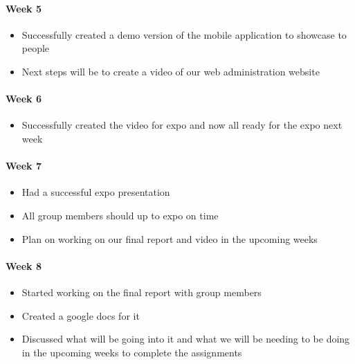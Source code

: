 \documentclass[onecolumn, draftclsnofoot,10pt, compsoc]{IEEEtran}
\begin{document}
      \paragraph{Week 5}
        \begin{itemize}
          \item Successfully created a demo version of the mobile application to showcase to people
          \item Next steps will be to create a video of our web administration website
        \end{itemize}

      \paragraph{Week 6}
        \begin{itemize}
          \item Successfully created the video for expo and now all ready for the expo next week
        \end{itemize}

      \paragraph{Week 7}
        \begin{itemize}
          \item Had a successful expo presentation
          \item All group members should up to expo on time
          \item Plan on working on our final report and video in the upcoming weeks
        \end{itemize}

      \paragraph{Week 8}
        \begin{itemize}
          \item Started working on the final report with group members
          \item Created a google docs for it
          \item Discussed what will be going into it and what we will be needing to be doing in the upcoming weeks to complete the assignments
        \end{itemize}
\end{document}
